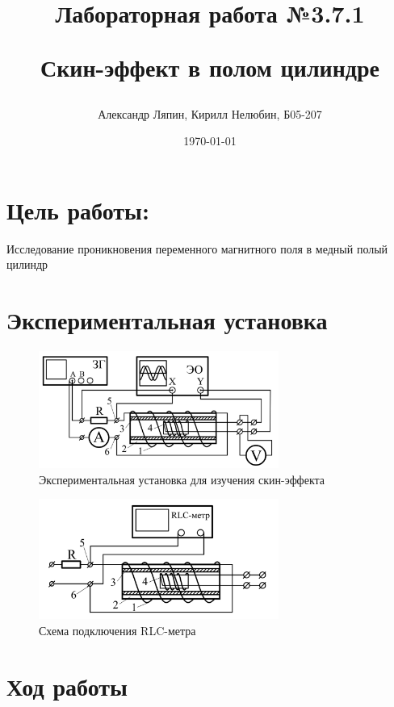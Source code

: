 \documentclass{article}
\begin{document}
\title{\begin{center}Лабораторная работа №3.7.1\end{center}
	Скин-эффект в полом цилиндре}
\author{Александр Ляпин, Кирилл Нелюбин, Б05-207}
\date{\today}

	\maketitle
	\section*{Цель работы:} Исследование проникновения переменного магнитного поля в медный полый цилиндр
	
	\section*{Экспериментальная установка}
\begin{figure}[H]
	\center
  \includegraphics*[width=0.7\textwidth]{24_12_48.png}
  \caption*{Экспериментальная установка для изучения скин-эффекта}
\end{figure}
\begin{figure}[H]
	\center
  \includegraphics*[width=0.7\textwidth]{24_12_59.png}
  \caption*{Схема подключения RLC-метра}
\end{figure}

	\section*{Ход работы}
	
\end{document}
